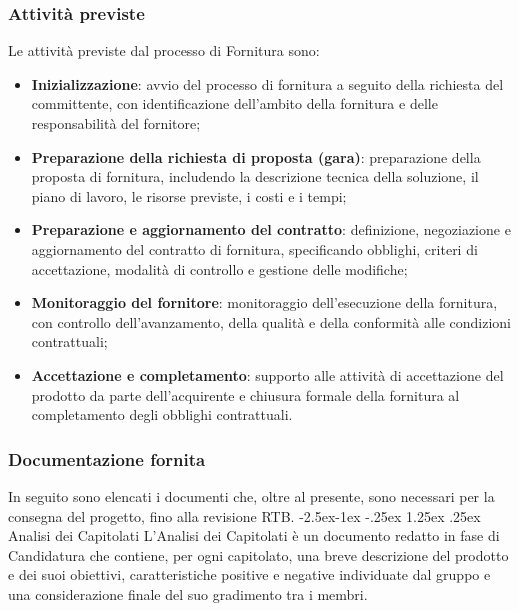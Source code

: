 \documentclass[a4paper,12pt]{article}
\makeatletter
\renewcommand\paragraph{\@startsection{paragraph}{4}{\z@}%
            {-2.5ex\@plus -1ex \@minus -.25ex}%
            {1.25ex \@plus .25ex}%
            {\normalfont\normalsize\bfseries}}
\makeatother
\begin{document}
        \subsubsection{Attività previste}
            Le attività previste dal processo di Fornitura sono:
            \begin{itemize}
                \item \textbf{Inizializzazione}: avvio del processo di fornitura a seguito della richiesta del committente, con identificazione dell'ambito della fornitura e delle responsabilità del fornitore;
                \item \textbf{Preparazione della richiesta di proposta (gara)}: preparazione della proposta di fornitura, includendo la descrizione tecnica della soluzione, il piano di lavoro, le risorse previste, i costi e i tempi;
                \item \textbf{Preparazione e aggiornamento del contratto}: definizione, negoziazione e aggiornamento del contratto di fornitura, specificando obblighi, criteri di accettazione, modalità di controllo e gestione delle modifiche;
                \item \textbf{Monitoraggio del fornitore}: monitoraggio dell'esecuzione della fornitura, con controllo dell'avanzamento, della qualità e della conformità alle condizioni contrattuali;
                \item \textbf{Accettazione e completamento}: supporto alle attività di accettazione del prodotto da parte dell'acquirente e chiusura formale della fornitura al completamento degli obblighi contrattuali.
            \end{itemize}
        

        \subsubsection{Documentazione fornita}
            In seguito sono elencati i documenti che, oltre al presente, sono necessari per la consegna del progetto, fino alla revisione RTB.
            \paragraph{Analisi dei Capitolati}
                L'Analisi dei Capitolati è un documento redatto in fase di Candidatura che contiene, per ogni capitolato, una breve descrizione del prodotto e dei suoi obiettivi, caratteristiche positive e negative individuate dal gruppo e una considerazione finale del suo gradimento tra i membri.
\end{document}
